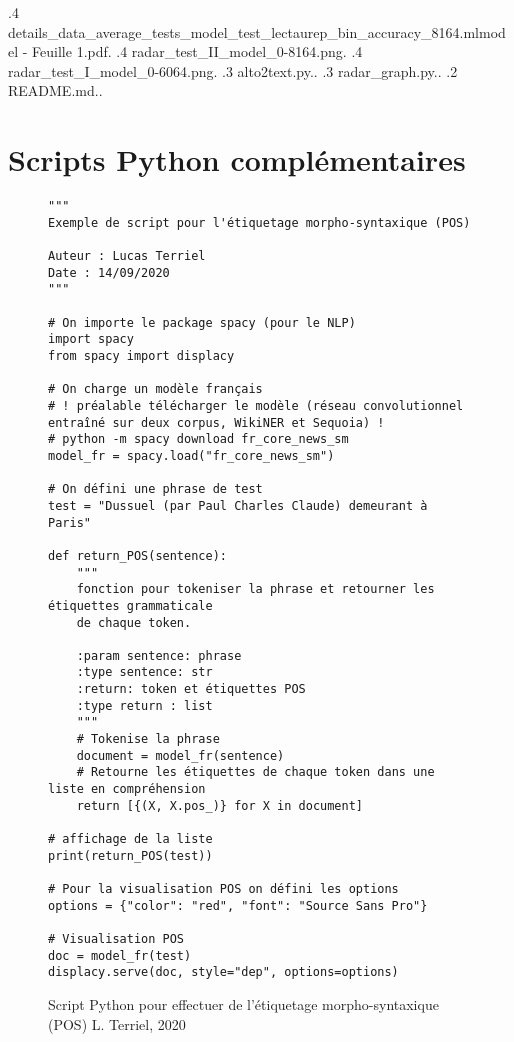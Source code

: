 {        .4   details\_data\_average\_tests\_model\_test\_lectaurep\_bin\_accuracy\_8164.mlmodel - Feuille 1.pdf.
        .4   radar\_test\_II\_model\_0-8164.png.
        .4  radar\_test\_I\_model\_0-6064.png.
    .3 alto2text.py..
    .3 radar\_graph.py..
   .2 README.md..
   }

\chapter{Scripts Python complémentaires}
\begin{figure}[h]
\lstset{language=Python}
\begin{lstlisting}
"""
Exemple de script pour l'étiquetage morpho-syntaxique (POS)

Auteur : Lucas Terriel
Date : 14/09/2020
"""

# On importe le package spacy (pour le NLP)
import spacy
from spacy import displacy

# On charge un modèle français
# ! préalable télécharger le modèle (réseau convolutionnel entraîné sur deux corpus, WikiNER et Sequoia) !
# python -m spacy download fr_core_news_sm
model_fr = spacy.load("fr_core_news_sm")

# On défini une phrase de test
test = "Dussuel (par Paul Charles Claude) demeurant à Paris"

def return_POS(sentence):
    """
    fonction pour tokeniser la phrase et retourner les étiquettes grammaticale
    de chaque token.

    :param sentence: phrase
    :type sentence: str
    :return: token et étiquettes POS
    :type return : list
    """
    # Tokenise la phrase
    document = model_fr(sentence)
    # Retourne les étiquettes de chaque token dans une liste en compréhension
    return [{(X, X.pos_)} for X in document]

# affichage de la liste
print(return_POS(test))

# Pour la visualisation POS on défini les options
options = {"color": "red", "font": "Source Sans Pro"}

# Visualisation POS
doc = model_fr(test)
displacy.serve(doc, style="dep", options=options)

\end{lstlisting}
\caption{Script Python pour effectuer de l'étiquetage morpho-syntaxique (POS) \textcopyright L. Terriel, 2020}
\label{fig:script_python_POS}
\end{figure}